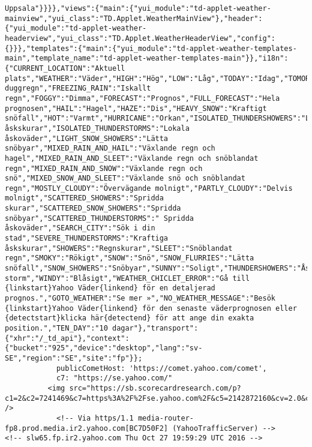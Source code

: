 \begin{verbatim}
Uppsala"}}}},"views":{"main":{"yui_module":"td-applet-weather-mainview","yui_class":"TD.Applet.WeatherMainView"},"header":{"yui_module":"td-applet-weather-headerview","yui_class":"TD.Applet.WeatherHeaderView","config":{}}},"templates":{"main":{"yui_module":"td-applet-weather-templates-main","template_name":"td-applet-weather-templates-main"}},"i18n":{"CURRENT_LOCATION":"Aktuell plats","WEATHER":"Väder","HIGH":"Hög","LOW":"Låg","TODAY":"Idag","TOMORROW":"Imorgon","SUNDAY":"Söndag","MONDAY":"Måndag","TUESDAY":"Tisdag","WEDNESDAY":"Onsdag","THURSDAY":"Torsdag","FRIDAY":"Fredag","SATURDAY":"Lördag","ABBR_SUNDAY":"Sön","ABBR_MONDAY":"Mån","ABBR_TUESDAY":"Tis","ABBR_WEDNESDAY":"Ons","ABBR_THURSDAY":"Tors","ABBR_FRIDAY":"Fre","ABBR_SATURDAY":"Lör","BLOWING_SNOW":"Snöoväder","BLUSTERY":"Vindbyar","CLEAR":"Klart","CLOUDY":"Molnigt","COLD":"Kallt","DRIZZLE":"Duggregn","DUST":"Damm","FAIR":"Vackert","FREEZING_DRIZZLE":"Kallt duggregn","FREEZING_RAIN":"Iskallt regn","FOGGY":"Dimma","FORECAST":"Prognos","FULL_FORECAST":"Hela prognosen","HAIL":"Hagel","HAZE":"Dis","HEAVY_SNOW":"Kraftigt snöfall","HOT":"Varmt","HURRICANE":"Orkan","ISOLATED_THUNDERSHOWERS":"Lokala åskskurar","ISOLATED_THUNDERSTORMS":"Lokala åskoväder","LIGHT_SNOW_SHOWERS":"Lätta snöbyar","MIXED_RAIN_AND_HAIL":"Växlande regn och hagel","MIXED_RAIN_AND_SLEET":"Växlande regn och snöblandat regn","MIXED_RAIN_AND_SNOW":"Växlande regn och snö","MIXED_SNOW_AND_SLEET":"Växlande snö och snöblandat regn","MOSTLY_CLOUDY":"Övervägande molnigt","PARTLY_CLOUDY":"Delvis molnigt","SCATTERED_SHOWERS":"Spridda skurar","SCATTERED_SNOW_SHOWERS":"Spridda snöbyar","SCATTERED_THUNDERSTORMS":" Spridda åskoväder","SEARCH_CITY":"Sök i din stad","SEVERE_THUNDERSTORMS":"Kraftiga åskskurar","SHOWERS":"Regnskurar","SLEET":"Snöblandat regn","SMOKY":"Rökigt","SNOW":"Snö","SNOW_FLURRIES":"Lätta snöfall","SNOW_SHOWERS":"Snöbyar","SUNNY":"Soligt","THUNDERSHOWERS":"Åskskurar","THUNDERSTORMS":"Åskoväder","TORNADO":"Tromb","TROPICAL_STORM":"Tropisk storm","WINDY":"Blåsigt","WEATHER_CHICLET_ERROR":"Gå till {linkstart}Yahoo Väder{linkend} för en detaljerad prognos.","GOTO_WEATHER":"Se mer »","NO_WEATHER_MESSAGE":"Besök {linkstart}Yahoo Väder{linkend} för den senaste väderprognosen eller {detectstart}klicka här{detectend} för att ange din exakta position.","TEN_DAY":"10 dagar"},"transport":{"xhr":"/_td_api"},"context":{"bucket":"925","device":"desktop","lang":"sv-SE","region":"SE","site":"fp"}};
            publicCometHost: 'https://comet.yahoo.com/comet',
		    c7: "https://se.yahoo.com/"
		  <img src="https://sb.scorecardresearch.com/p?c1=2&c2=7241469&c7=https%3A%2F%2Fse.yahoo.com%2F&c5=2142872160&cv=2.0&cj=1" />
            <!-- Via https/1.1 media-router-fp8.prod.media.ir2.yahoo.com[BC7D50F2] (YahooTrafficServer) -->
<!-- slw65.fp.ir2.yahoo.com Thu Oct 27 19:59:29 UTC 2016 -->
\end{verbatim}
